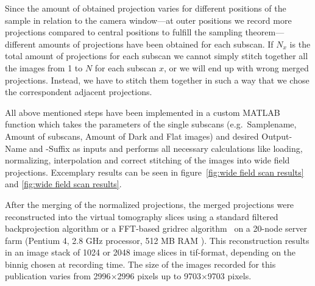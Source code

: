 Since the amount of obtained projection varies for different positions of the sample in relation to the camera window---at outer positions we record more projections compared to central positions to fulfill the sampling theorem---different amounts of projections have been obtained for each subscan. If $N_x$ is the total amount of projections for each subscan we cannot simply stitch together all the images from 1 to $N$ for each subscan $x$, or we will end up with wrong merged projections. Instead, we have to stitch them together in such a way that we chose the correspondent adjacent projections. 

All above mentioned steps have been implemented in a custom MATLAB\textsuperscript{\textregistered} function which takes the parameters of the single subscans (e.g.\ Samplename, Amount of subscans, Amount of Dark and Flat images) and desired Output-Name and -Suffix as inputs and performs all necessary calculations like loading, normalizing, interpolation and correct stitching of the images into wide field projections. Excemplary results can be seen in figure~\ref{fig:wide field scan results} and \ref{fig:wide field scan results}.

After the merging of the normalized projections, the merged projections were reconstructed into the virtual tomography slices using a standard filtered backprojection algorithm or a FFT-based gridrec algorithm~\cite{Dowd2003} on a 20-node server farm (Pentium 4, 2.8 GHz processor, 512 MB RAM ). This reconstruction results in an image stack of 1024 or 2048 image slices in tif-format, depending on the binnig chosen at recording time. The size of the images recorded for this publication varies from 2996$\times$2996 pixels up to 9703$\times$9703 pixels.